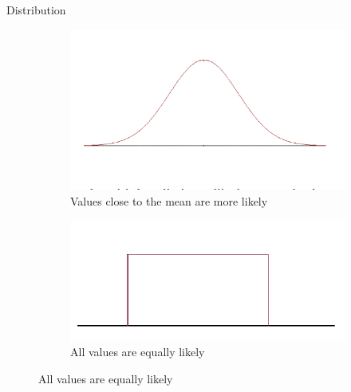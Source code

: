 \begin{frame}[t]{Distribution}
	\begin{figure}[h]
		\centering
		\begin{subfigure}{0.45\textwidth}
			\centering
			\includegraphics[trim={0 1cm 0 0}, clip, scale=0.4]{eda/nd.png}
			\caption{Values close to the mean are more likely}
		\end{subfigure}
		\hfil
		\begin{subfigure}{0.45\textwidth}
			\centering
			\includegraphics[scale=0.5]{eda/nd2.png}
			\caption{All values are equally likely}
		\end{subfigure}
		
	\end{figure}
\end{frame}

